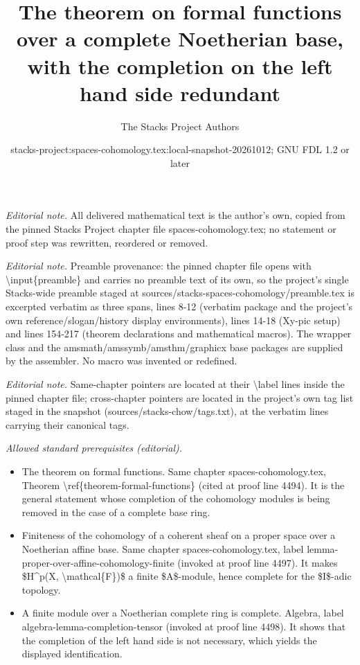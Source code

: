 \documentclass[10pt,a4paper]{amsart}
\title{The theorem on formal functions over a complete Noetherian base, with the completion on the left hand side redundant}
\author{The Stacks Project Authors}
\date{stacks-project:spaces-cohomology.tex:local-snapshot-20261012; GNU FDL 1.2 or later}
\theoremstyle{plain}
\theoremstyle{definition}
\theoremstyle{remark}
\numberwithin{equation}{subsection}
\begin{document}
\maketitle
\noindent\textit{Editorial note.} All delivered mathematical text is the author's own, copied from the pinned Stacks Project chapter file spaces-cohomology.tex; no statement or proof step was rewritten, reordered or removed.\par\medskip
\noindent\textit{Editorial note.} Preamble provenance: the pinned chapter file opens with \textbackslash{}input\{preamble\} and carries no preamble text of its own, so the project's single Stacks-wide preamble staged at sources/stacks-spaces-cohomology/preamble.tex is excerpted verbatim as three spans, lines 8-12 (verbatim package and the project's own reference/slogan/history display environments), lines 14-18 (Xy-pic setup) and lines 154-217 (theorem declarations and mathematical macros). The wrapper class and the amsmath/amssymb/amsthm/graphicx base packages are supplied by the assembler. No macro was invented or redefined.\par\medskip
\noindent\textit{Editorial note.} Same-chapter pointers are located at their \textbackslash{}label lines inside the pinned chapter file; cross-chapter pointers are located in the project's own tag list staged in the snapshot (sources/stacks-chow/tags.txt), at the verbatim lines carrying their canonical tags.\par\medskip
\noindent\textit{Allowed standard prerequisites (editorial).}\begin{itemize}
\item The theorem on formal functions. Same chapter spaces-cohomology.tex, Theorem \textbackslash{}ref\{theorem-formal-functions\} (cited at proof line 4494). It is the general statement whose completion of the cohomology modules is being removed in the case of a complete base ring.
\item Finiteness of the cohomology of a coherent sheaf on a proper space over a Noetherian affine base. Same chapter spaces-cohomology.tex, label lemma-proper-over-affine-cohomology-finite (invoked at proof line 4497). It makes \$H\textasciicircum{}p(X, \textbackslash{}mathcal\{F\})\$ a finite \$A\$-module, hence complete for the \$I\$-adic topology.
\item A finite module over a Noetherian complete ring is complete. Algebra, label algebra-lemma-completion-tensor (invoked at proof line 4498). It shows that the completion of the left hand side is not necessary, which yields the displayed identification.
\end{itemize}\medskip
\end{document}
